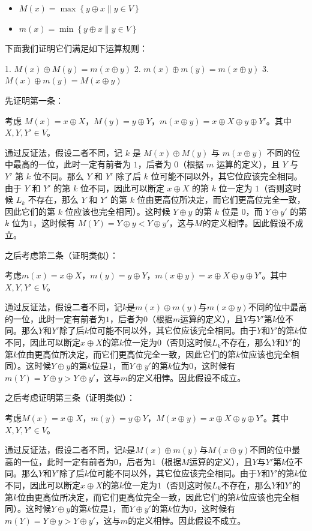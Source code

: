 \documentclass[UTF8, twoside]{ctexart}
\begin{document}
\begin{sloppypar}
\begin{itemize}
   \item $M(x)=\max \left\{y\oplus x\| y\in V \right\}$
   \item $m(x)=\min \left\{y\oplus x\| y\in V \right\}$
\end{itemize}

下面我们证明它们满足如下运算规则：

1. $M(x)\oplus M(y)=m(x\oplus y)$
2. $m(x)\oplus m(y)=m(x\oplus y)$
3. $M(x)\oplus m(y)=M(x\oplus y)$

先证明第一条：

考虑 $M(x)=x\oplus X$，$M(y)=y\oplus Y$，$m(x\oplus y)=x\oplus X\oplus y\oplus Y'$。其中 $X,Y,Y'\in V$。

通过反证法，假设二者不同，记 $k$ 是 $M(x)\oplus M(y)$ 与 $m(x\oplus y)$ 不同的位中最高的一位，此时一定有前者为 $1$，后者为 $0$（根据 $m$ 运算的定义），且 $Y$ 与 $Y'$ 第 $k$ 位不同。那么 $Y$ 和 $Y'$ 除了后 $k$ 位可能不同以外，其它位应该完全相同。由于 $Y$ 和 $Y'$ 的第 $k$ 位不同，因此可以断定 $x\oplus X$ 的第 $k$ 位一定为 $1$（否则这时候 $L_k$ 不存在，那么 $Y$ 和 $Y'$ 的第 $k$ 位由更高位所决定，而它们更高位完全一致，因此它们的第 $k$ 位应该也完全相同）。这时候 $Y\oplus y$ 的第 $k$ 位是 $0$，而 $Y\oplus y'$ 的第 $k$ 位为$1$，这时候有 $M(Y)=Y\oplus y<Y\oplus y'$，这与$M$的定义相悖。因此假设不成立。

之后考虑第二条（证明类似）：

考虑$m(x)=x\oplus X$，$m(y)=y\oplus Y$，$m(x\oplus y)=x\oplus X\oplus y\oplus Y'$。其中$X,Y,Y'\in V$。

通过反证法，假设二者不同，记$k$是$m(x)\oplus m(y)$与$m(x\oplus y)$不同的位中最高的一位，此时一定有前者为$1$，后者为$0$（根据$m$运算的定义），且$Y$与$Y'$第$k$位不同。那么$Y$和$Y'$除了后$k$位可能不同以外，其它位应该完全相同。由于$Y$和$Y'$的第$k$位不同，因此可以断定$x\oplus X$的第$k$位一定为$0$（否则这时候$L_k$不存在，那么$Y$和$Y'$的第$k$位由更高位所决定，而它们更高位完全一致，因此它们的第$k$位应该也完全相同）。这时候$Y\oplus y$的第$k$位是$1$，而$Y\oplus y'$的第$k$位为$0$，这时候有$m(Y)=Y\oplus y>Y\oplus y'$，这与$m$的定义相悖。因此假设不成立。

之后考虑证明第三条（证明类似）：

考虑$M(x)=x\oplus X$，$m(y)=y\oplus Y$，$M(x\oplus y)=x\oplus X\oplus y\oplus Y'$。其中$X,Y,Y'\in V$。

通过反证法，假设二者不同，记$k$是$M(x)\oplus m(y)$与$M(x\oplus y)$不同的位中最高的一位，此时一定有前者为$0$，后者为$1$（根据$M$运算的定义），且$Y$与$Y'$第$k$位不同。那么$Y$和$Y'$除了后$k$位可能不同以外，其它位应该完全相同。由于$Y$和$Y'$的第$k$位不同，因此可以断定$x\oplus X$的第$k$位一定为$1$（否则这时候$L_k$不存在，那么$Y$和$Y'$的第$k$位由更高位所决定，而它们更高位完全一致，因此它们的第$k$位应该也完全相同）。这时候$Y\oplus y$的第$k$位是$1$，而$Y\oplus y'$的第$k$位为$0$，这时候有$m(Y)=Y\oplus y>Y\oplus y'$，这与$m$的定义相悖。因此假设不成立。


\end{sloppypar}
\end{document}
